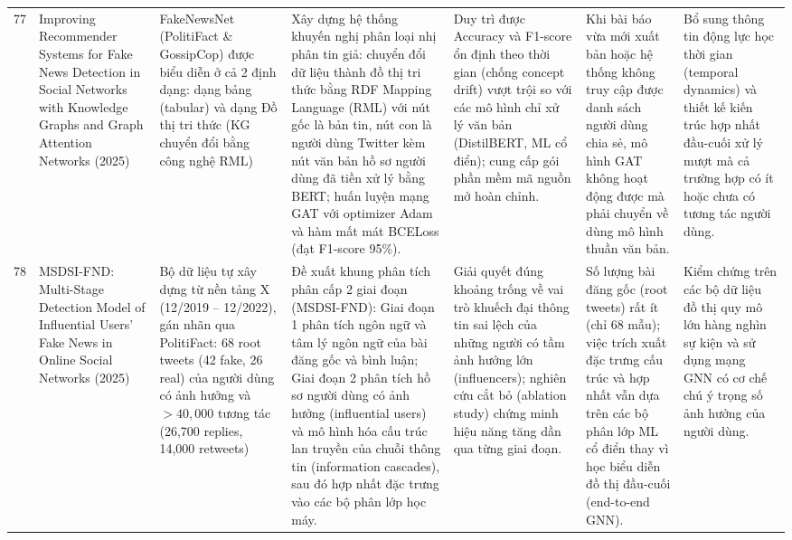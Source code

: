 \documentclass[11pt,a4paper]{extreport}
\begin{document}
\begin{landscape}
\begin{longtable}{@{}C{0.6cm}p{3.6cm}p{2.7cm}p{4.8cm}p{3.6cm}p{3.6cm}p{3.6cm}@{}}
77 & Improving Recommender Systems for Fake News Detection in Social Networks with Knowledge Graphs and Graph Attention Networks (2025) \cite{noauthor_improving_2025} & FakeNewsNet (PolitiFact \& GossipCop) được biểu diễn ở cả 2 định dạng: dạng bảng (tabular) và dạng Đồ thị tri thức (KG chuyển đổi bằng công nghệ RML) & Xây dựng hệ thống khuyến nghị phân loại nhị phân tin giả: chuyển đổi dữ liệu thành đồ thị tri thức bằng RDF Mapping Language (RML) với nút gốc là bản tin, nút con là người dùng Twitter kèm nút văn bản hồ sơ người dùng đã tiền xử lý bằng BERT; huấn luyện mạng GAT với optimizer Adam và hàm mất mát BCELoss (đạt F1-score 95\%). & Duy trì được Accuracy và F1-score ổn định theo thời gian (chống concept drift) vượt trội so với các mô hình chỉ xử lý văn bản (DistilBERT, ML cổ điển); cung cấp gói phần mềm mã nguồn mở hoàn chỉnh. & Khi bài báo vừa mới xuất bản hoặc hệ thống không truy cập được danh sách người dùng chia sẻ, mô hình GAT không hoạt động được mà phải chuyển về dùng mô hình thuần văn bản. & Bổ sung thông tin động lực học thời gian (temporal dynamics) và thiết kế kiến trúc hợp nhất đầu-cuối xử lý mượt mà cả trường hợp có ít hoặc chưa có tương tác người dùng. \\ 

78 & MSDSI-FND: Multi-Stage Detection Model of Influential Users’ Fake News in Online Social Networks (2025) \cite{noauthor_msdsi-fnd_2025} & Bộ dữ liệu tự xây dựng từ nền tảng X (12/2019 -- 12/2022), gán nhãn qua PolitiFact: 68 root tweets (42 fake, 26 real) của người dùng có ảnh hưởng và $>40,000$ tương tác (26,700 replies, 14,000 retweets) & Đề xuất khung phân tích phân cấp 2 giai đoạn (MSDSI-FND): Giai đoạn 1 phân tích ngôn ngữ và tâm lý ngôn ngữ của bài đăng gốc và bình luận; Giai đoạn 2 phân tích hồ sơ người dùng có ảnh hưởng (influential users) và mô hình hóa cấu trúc lan truyền của chuỗi thông tin (information cascades), sau đó hợp nhất đặc trưng vào các bộ phân lớp học máy. & Giải quyết đúng khoảng trống về vai trò khuếch đại thông tin sai lệch của những người có tầm ảnh hưởng lớn (influencers); nghiên cứu cắt bỏ (ablation study) chứng minh hiệu năng tăng dần qua từng giai đoạn. & Số lượng bài đăng gốc (root tweets) rất ít (chỉ 68 mẫu); việc trích xuất đặc trưng cấu trúc và hợp nhất vẫn dựa trên các bộ phân lớp ML cổ điển thay vì học biểu diễn đồ thị đầu-cuối (end-to-end GNN). & Kiểm chứng trên các bộ dữ liệu đồ thị quy mô lớn hàng nghìn sự kiện và sử dụng mạng GNN có cơ chế chú ý trọng số ảnh hưởng của người dùng. \\ 


\end{longtable}
\end{landscape}
\end{document}
